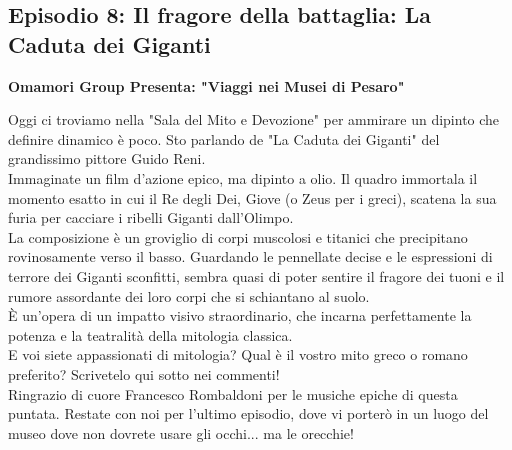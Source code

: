 \documentclass[hidelinks,12pt,a4paper]{article}
\begin{document}
\begin{flushleft}
		\subsection{Episodio 8: Il fragore della battaglia: La Caduta dei Giganti}
		\begin{center}
			\textbf{Omamori Group Presenta: "Viaggi nei Musei di Pesaro"}
		\end{center}
		Oggi ci troviamo nella "Sala del Mito e Devozione" per ammirare un dipinto che definire dinamico è poco. Sto parlando de "La Caduta dei Giganti" del grandissimo pittore Guido Reni.\\
		Immaginate un film d'azione epico, ma dipinto a olio. Il quadro immortala il momento esatto in cui il Re degli Dei, Giove (o Zeus per i greci), scatena la sua furia per cacciare i ribelli Giganti dall'Olimpo.\\
		La composizione è un groviglio di corpi muscolosi e titanici che precipitano rovinosamente verso il basso. Guardando le pennellate decise e le espressioni di terrore dei Giganti sconfitti, sembra quasi di poter sentire il fragore dei tuoni e il rumore assordante dei loro corpi che si schiantano al suolo.\\
		È un'opera di un impatto visivo straordinario, che incarna perfettamente la potenza e la teatralità della mitologia classica.\\
		E voi siete appassionati di mitologia? Qual è il vostro mito greco o romano preferito? Scrivetelo qui sotto nei commenti!\\
		Ringrazio di cuore Francesco Rombaldoni per le musiche epiche di questa puntata. Restate con noi per l'ultimo episodio, dove vi porterò in un luogo del museo dove non dovrete usare gli occhi... ma le orecchie!\\
		

\end{flushleft}
\end{document}
